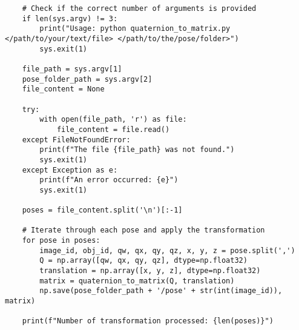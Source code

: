 \begin{lstlisting}
    # Check if the correct number of arguments is provided
    if len(sys.argv) != 3:
        print("Usage: python quaternion_to_matrix.py </path/to/your/text/file> </path/to/the/pose/folder>")
        sys.exit(1)

    file_path = sys.argv[1]
    pose_folder_path = sys.argv[2]
    file_content = None

    try:
        with open(file_path, 'r') as file:
            file_content = file.read()
    except FileNotFoundError:
        print(f"The file {file_path} was not found.")
        sys.exit(1)
    except Exception as e:
        print(f"An error occurred: {e}")
        sys.exit(1)

    poses = file_content.split('\n')[:-1]
    
    # Iterate through each pose and apply the transformation
    for pose in poses:
        image_id, obj_id, qw, qx, qy, qz, x, y, z = pose.split(',')
        Q = np.array([qw, qx, qy, qz], dtype=np.float32)
        translation = np.array([x, y, z], dtype=np.float32)
        matrix = quaternion_to_matrix(Q, translation)
        np.save(pose_folder_path + '/pose' + str(int(image_id)), matrix)

    print(f"Number of transformation processed: {len(poses)}")
\end{lstlisting}

\bigskip

